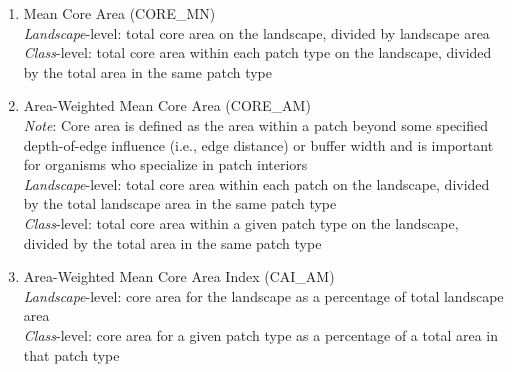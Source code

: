 \begin{enumerate}
	\item Mean Core Area (CORE\_MN)\\
	\emph{Landscape}-level: total core area on the landscape, divided by landscape area\\
	\emph{Class}-level: total core area within each patch type on the landscape, divided by the total area in the same patch type\\
	
	\item Area-Weighted Mean Core Area (CORE\_AM)\\
	\emph{Note}: Core area is defined as the area within a patch beyond some specified depth-of-edge influence (i.e., edge distance) or buffer width and is important for organisms who specialize in patch interiors 	\\
	\emph{Landscape}-level: total core area within each patch on the landscape, divided by the total landscape area in the same patch type	\\
	\emph{Class}-level: total core area within a given patch type on the landscape, divided by the total area in the same patch type	\\
	
	\item Area-Weighted Mean Core Area Index (CAI\_AM)\\
	\emph{Landscape}-level: core area for the landscape as a percentage of total landscape area \\
	\emph{Class}-level: core area for a given patch type as a percentage of a total area in that patch type
	

\end{enumerate}
